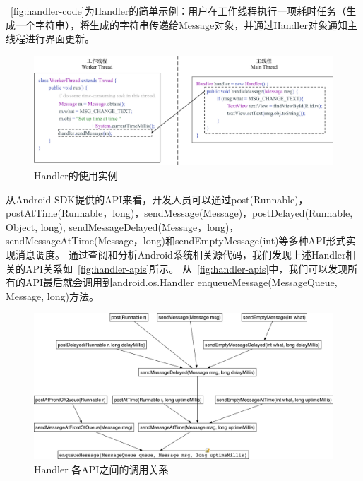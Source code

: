 ~\autoref{fig:handler-code}为Handler的简单示例：用户在工作线程执行一项耗时任务（生成一个字符串），将生成的字符串传递给Message对象，并通过Handler对象通知主线程进行界面更新。


\begin{figure}[h]
	\centering
	\includegraphics[width=\textwidth]{./Figures/handler-code.png}
	\caption{Handler的使用实例}
	\label{fig:handler-code}
\end{figure}


从Android SDK提供的API来看，开发人员可以通过post(Runnable)，postAtTime(Runnable，long)，sendMessage(Message)，postDelayed(Runnable, Object, long),
 sendMessageDelayed(Message，long)，sendMessageAtTime(Message，long)和sendEmptyMessage(int)等多种API形式实现消息调度。
 通过查阅和分析Android系统相关源代码，我们发现上述Handler相关的API关系如~\autoref{fig:handler-apis}所示。
从~\autoref{fig:handler-apis}中，我们可以发现所有的API最后就会调用到android.os.Handler enqueueMessage(MessageQueue, Message, long)方法。

\begin{figure}[h]
	\centering
	\includegraphics[width=\textwidth]{./Figures/Handler-apis.png}
	\caption{ Handler 各API之间的调用关系}
	\label{fig:handler-apis}
\end{figure}




